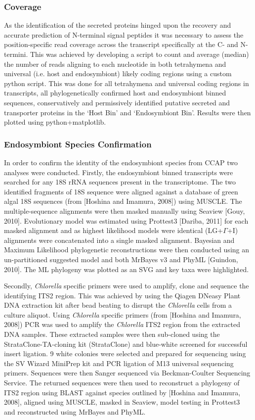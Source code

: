 \subsubsection{Coverage}
As the identification of the secreted proteins hinged upon the recovery and accurate prediction of N-terminal signal peptides it was necessary to assess the position-specific read coverage across the transcript specifically at the C- and N- termini. 
This was achieved by developing a script to count and average (median) the number of reads aligning to each nucleotide in both tetrahymena and universal (i.e. host and endosymbiont) likely coding regions using a custom python script.  
This was done for all tetrahymena and universal coding regions in transcripts, all phylogenetically confirmed host and endosymbiont binned sequences, conservatively and permissively identified putative secreted and transporter proteins in the `Host Bin' and `Endosymbiont Bin'. 
Results were then plotted using python+matplotlib.

\subsubsection{Endosymbiont Species Confirmation}
In order to confirm the identity of the endosymbiont species from CCAP two analyses were conducted. 
Firstly, the endosymbiont binned transcripts were searched for any 18S rRNA sequences present in the transcriptome.  
The two identified fragments of 18S sequence were aligned against a database of green algal 18S sequences (from [Hoshina and Imamura, 2008]) using MUSCLE.    
The multiple-sequence alignments were then masked manually using Seaview [Gouy, 2010].  
Evolutionary model was estimated using Prottest3 [Dariba, 2011] for each masked alignment and as highest likelihood models were identical (LG+$\Gamma$+I) alignments were concatenated into a single masked alignment.  
Bayesian and Maximum Likelihood phylogenetic reconstructions were then conducted using an un-partitioned suggested model and both MrBayes v3 and PhyML [Guindon, 2010].  
The ML phylogeny was plotted as an SVG and key taxa were highlighted.

Secondly, \textit{Chlorella} specific primers were used to amplify, clone and sequence the identifying ITS2 region.  
This was achieved by using the Qiagen DNeasy Plant DNA extraction kit after bead beating to disrupt the \textit{Chlorella} cells from a culture aliquot. 
Using \textit{Chlorella} specific primers (from [Hoshina and Imamura, 2008]) PCR was used to amplify the \textit{Chlorella} ITS2 region from the  extracted DNA samples.  
These extracted samples were then sub-cloned using the StrataClone-TA-cloning kit (StrataClone) and blue-white screened for successful insert ligation. 
9 white colonies were selected and prepared for sequencing using the SV Wizard MiniPrep kit and PCR ligation of M13 universal sequencing primers.  
Sequences were then Sanger sequenced via Beckman-Coulter Sequencing Service.  
The returned sequences were then used to reconstruct a phylogeny of ITS2 region using BLAST against species outlined by [Hoshina and Imamura, 2008], aligned using MUSCLE, masked in Seaview, model testing in Prottest3 and reconstructed using MrBayes and PhyML.

